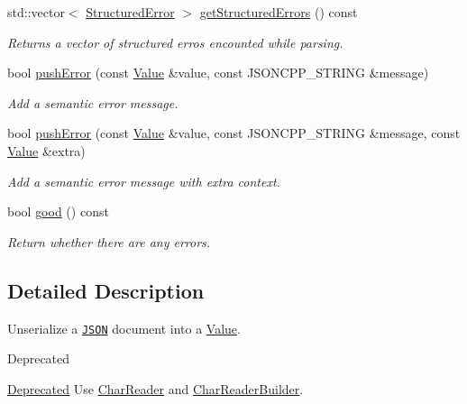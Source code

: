 \begin{DoxyCompactItemize}
std\+::vector$<$ \hyperlink{structJson_1_1Reader_1_1StructuredError}{Structured\+Error} $>$ \hyperlink{classJson_1_1Reader_a08c2ea5ffc7d2a9c9e35020835624f0b}{get\+Structured\+Errors} () const 
\begin{DoxyCompactList}\small\item\em Returns a vector of structured erros encounted while parsing. \end{DoxyCompactList}\item 
bool \hyperlink{classJson_1_1Reader_af5fa7099083f01706635ade1d0f8ddb5}{push\+Error} (const \hyperlink{classJson_1_1Value}{Value} \&value, const J\+S\+O\+N\+C\+P\+P\+\_\+\+S\+T\+R\+I\+NG \&message)
\begin{DoxyCompactList}\small\item\em Add a semantic error message. \end{DoxyCompactList}\item 
bool \hyperlink{classJson_1_1Reader_a3568be9db568ff57bd3fcc373143dff3}{push\+Error} (const \hyperlink{classJson_1_1Value}{Value} \&value, const J\+S\+O\+N\+C\+P\+P\+\_\+\+S\+T\+R\+I\+NG \&message, const \hyperlink{classJson_1_1Value}{Value} \&extra)
\begin{DoxyCompactList}\small\item\em Add a semantic error message with extra context. \end{DoxyCompactList}\item 
bool \hyperlink{classJson_1_1Reader_a06b52dcc656549506b1ae6f05167ecf4}{good} () const 
\begin{DoxyCompactList}\small\item\em Return whether there are any errors. \end{DoxyCompactList}\end{DoxyCompactItemize}


\subsection{Detailed Description}
Unserialize a \href{http://www.json.org}{\tt J\+S\+ON} document into a \hyperlink{classJson_1_1Value}{Value}. 

\begin{DoxyRefDesc}{Deprecated}
\item[\hyperlink{deprecated__deprecated000005}{Deprecated}]Use \hyperlink{classJson_1_1CharReader}{Char\+Reader} and \hyperlink{classJson_1_1CharReaderBuilder}{Char\+Reader\+Builder}. \end{DoxyRefDesc}


